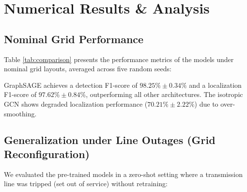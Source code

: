 \documentclass[conference]{IEEEtran}
\begin{document}
\section{Numerical Results \& Analysis}

\subsection{Nominal Grid Performance}
Table \ref{tab:comparison} presents the performance metrics of the models under nominal grid layouts, averaged across five random seeds:

\begin{table}[htbp]
  \caption{Performance Comparison under Nominal Grid Layout}
  \label{tab:comparison}
  \centering
\end{table}

GraphSAGE achieves a detection F1-score of $98.25\% \pm 0.34\%$ and a localization F1-score of $97.62\% \pm 0.84\%$, outperforming all other architectures. The isotropic GCN shows degraded localization performance ($70.21\% \pm 2.22\%$) due to over-smoothing.

\subsection{Generalization under Line Outages (Grid Reconfiguration)}
We evaluated the pre-trained models in a zero-shot setting where a transmission line was tripped (set out of service) without retraining:
\end{document}
